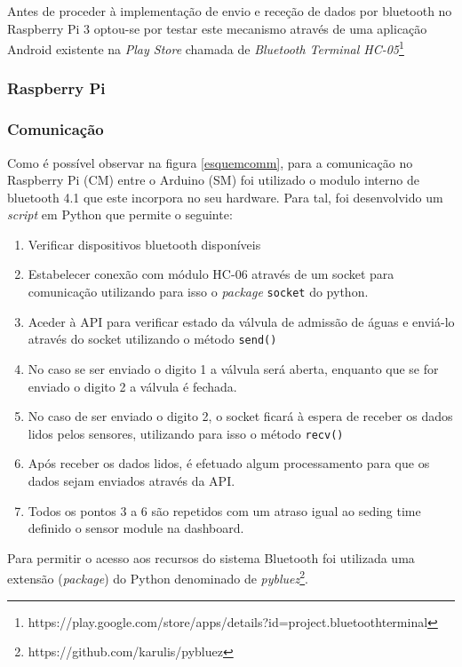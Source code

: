 Antes de proceder à implementação de envio e receção de dados por bluetooth no Raspberry Pi 3 optou-se por testar este mecanismo através de uma aplicação Android existente na \textit{Play Store} chamada de \textit{Bluetooth Terminal HC-05}\footnote{https://play.google.com/store/apps/details?id=project.bluetoothterminal}

\subsubsection{Raspberry Pi}


\subsubsection{Comunicação}


Como é possível observar na figura \ref{esquemcomm}, para a comunicação no Raspberry Pi (\ac{CM}) entre o Arduino (\ac{SM}) foi utilizado o modulo interno de bluetooth 4.1 que este incorpora no seu hardware. Para tal, foi desenvolvido um \textit{script} em Python que permite o seguinte: 


\begin{enumerate}
	\item Verificar dispositivos bluetooth disponíveis
	\item Estabelecer conexão com módulo HC-06 através de um socket para comunicação utilizando para isso o \textit{package} \texttt{socket} do python. 
	\item Aceder à API para verificar estado da válvula de admissão de águas e enviá-lo através do socket utilizando o método \texttt{send()} 
	\item No caso se ser enviado o digito 1 a válvula será aberta, enquanto que se for enviado o digito 2 a válvula é fechada. 
	\item No caso de ser enviado o digito 2, o socket ficará à espera de receber os dados lidos pelos sensores, utilizando para isso o método \texttt{recv()}
	\item Após receber os dados lidos, é efetuado algum processamento para que os dados sejam enviados através da API. 
	\item Todos os pontos 3 a 6 são repetidos com um atraso igual ao seding time definido o sensor module na dashboard. 
	
\end{enumerate}

Para permitir o acesso aos recursos do sistema Bluetooth foi utilizada uma extensão (\textit{package}) do Python denominado de \textit{pybluez}\footnote{https://github.com/karulis/pybluez}. 




